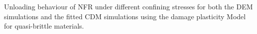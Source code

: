 \label{fig:fitted4} Unloading behaviour of NFR under different confining stresses for both the DEM simulations and the fitted CDM simulations using the damage plasticity Model for quasi-brittle materials.